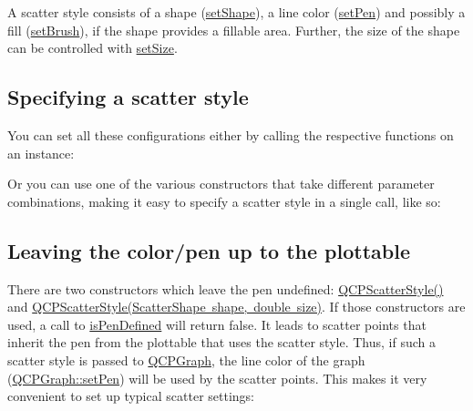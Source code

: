A scatter style consists of a shape (\mbox{\hyperlink{class_q_c_p_scatter_style_a7c641c4d4c6d29cb705d3887cfce91c1}{set\+Shape}}), a line color (\mbox{\hyperlink{class_q_c_p_scatter_style_a761f1f229cc0ca4703e1e2b89f6dd1ba}{set\+Pen}}) and possibly a fill (\mbox{\hyperlink{class_q_c_p_scatter_style_a74d692aaeb8d4b36d6f7d510e44264b1}{set\+Brush}}), if the shape provides a fillable area. Further, the size of the shape can be controlled with \mbox{\hyperlink{class_q_c_p_scatter_style_aaefdd031052892c4136129db68596e0f}{set\+Size}}.\hypertarget{class_q_c_p_scatter_style_QCPScatterStyle-defining}{}\subsection{Specifying a scatter style}\label{class_q_c_p_scatter_style_QCPScatterStyle-defining}
You can set all these configurations either by calling the respective functions on an instance\+: 
\begin{DoxyCodeInclude}{0}
\end{DoxyCodeInclude}
 Or you can use one of the various constructors that take different parameter combinations, making it easy to specify a scatter style in a single call, like so\+: 
\begin{DoxyCodeInclude}{0}
\end{DoxyCodeInclude}
 \hypertarget{class_q_c_p_scatter_style_QCPScatterStyle-undefinedpen}{}\subsection{Leaving the color/pen up to the plottable}\label{class_q_c_p_scatter_style_QCPScatterStyle-undefinedpen}
There are two constructors which leave the pen undefined\+: \mbox{\hyperlink{class_q_c_p_scatter_style_a8836018d9ad83ccd8870de8315c1be73}{Q\+C\+P\+Scatter\+Style()}} and \mbox{\hyperlink{class_q_c_p_scatter_style_a003d92f74f4561eda111862eadd62f28}{Q\+C\+P\+Scatter\+Style(\+Scatter\+Shape shape, double size)}}. If those constructors are used, a call to \mbox{\hyperlink{class_q_c_p_scatter_style_a47077eb6450fe9a788f833e4ec1b1d5a}{is\+Pen\+Defined}} will return false. It leads to scatter points that inherit the pen from the plottable that uses the scatter style. Thus, if such a scatter style is passed to \mbox{\hyperlink{class_q_c_p_graph}{Q\+C\+P\+Graph}}, the line color of the graph (\mbox{\hyperlink{class_q_c_p_abstract_plottable_ab74b09ae4c0e7e13142fe4b5bf46cac7}{Q\+C\+P\+Graph\+::set\+Pen}}) will be used by the scatter points. This makes it very convenient to set up typical scatter settings\+:


